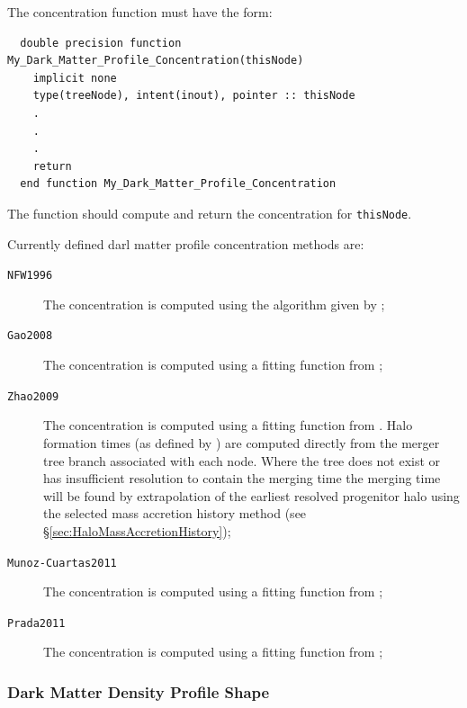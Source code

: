 The concentration function must have the form:
\begin{verbatim}
  double precision function My_Dark_Matter_Profile_Concentration(thisNode)
    implicit none
    type(treeNode), intent(inout), pointer :: thisNode
    .
    .
    .
    return
  end function My_Dark_Matter_Profile_Concentration
\end{verbatim}
The function should compute and return the concentration for {\tt thisNode}.

Currently defined darl matter profile concentration methods are:
\begin{description}
 \item [{\tt NFW1996}] The concentration is computed using the algorithm given by \cite{navarro_structure_1996};
 \item [{\tt Gao2008}] The concentration is computed using a fitting function from \cite{gao_redshift_2008};
 \item [{\tt Zhao2009}] The concentration is computed using a fitting function from \cite{zhao_accurate_2009}. Halo formation times (as defined by \citealt{zhao_accurate_2009}) are computed directly from the merger tree branch associated with each node. Where the tree does not exist or has insufficient resolution to contain the merging time the merging time will be found by extrapolation of the earliest resolved progenitor halo using the selected mass accretion history method (see \S\ref{sec:HaloMassAccretionHistory});
 \item [{\tt Munoz-Cuartas2011}] The concentration is computed using a fitting function from \cite{munoz-cuartas_redshift_2011};
 \item [{\tt Prada2011}] The concentration is computed using a fitting function from \cite{prada_halo_2011};
\end{description}

\subsubsection{Dark Matter Density Profile Shape}\label{sec:darkMatterProfileShape}

